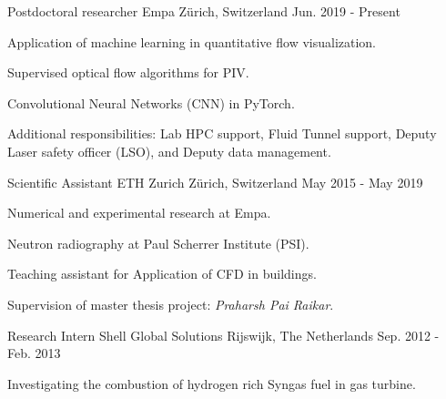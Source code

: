 \documentclass[11pt, a4paper]{awesome-cv}
\begin{document}
\begin{cventries}

  \cventry
    {Postdoctoral researcher} %
    {Empa} %
    {Z\"urich, Switzerland} %
    {Jun. 2019 - Present} %
    {
      \begin{cvitems} %
        \item {Application of machine learning in quantitative flow visualization.}
        \item {Supervised optical flow algorithms for PIV.}
        \item {Convolutional Neural Networks (CNN) in PyTorch.}
        \item {Additional responsibilities: Lab HPC support, Fluid Tunnel support, Deputy Laser safety officer (LSO), and Deputy data management.}
      \end{cvitems}
    }

  \cventry
    {Scientific Assistant}
    {ETH Zurich}
    {Z\"urich, Switzerland}
    {May 2015 - May 2019}
    {
      \begin{cvitems}
        \item {Numerical and experimental research at Empa.}
        \item {Neutron radiography at Paul Scherrer Institute (PSI).}
        \item {Teaching assistant for Application of CFD in buildings.}
        \item {Supervision of master thesis project: \textit{Praharsh Pai Raikar}.}
      \end{cvitems}
    }

    \cventry
    {Research Intern}
    {Shell Global Solutions}
    {Rijswijk, The Netherlands}
    {Sep. 2012 - Feb. 2013}
    {
      \begin{cvitems}
        \item {Investigating the combustion of hydrogen rich Syngas fuel in gas turbine.}
      \end{cvitems}
    }

\end{cventries}



\end{document}
